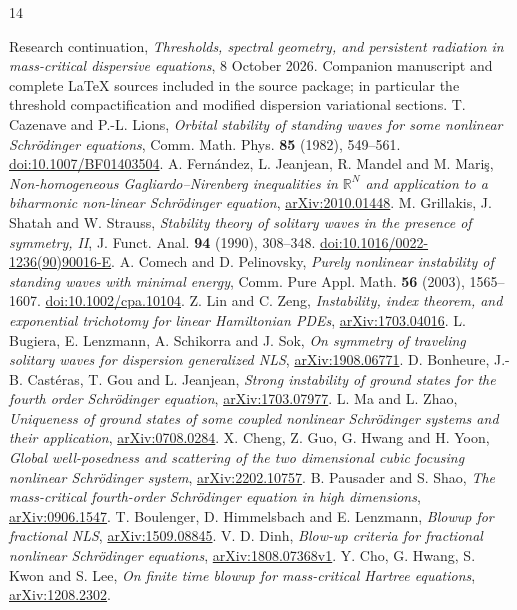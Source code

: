 \documentclass[11pt,a4paper]{article}
\theoremstyle{remark}\newtheorem{remark}[theorem]{Remark}
\begin{document}
\clearpage
\begin{thebibliography}{14}
\raggedright
{} Research continuation,
\emph{Thresholds, spectral geometry, and persistent radiation in
mass-critical dispersive equations}, 8 October 2026.
Companion manuscript and complete LaTeX sources included in the source
package; in particular the threshold compactification and modified
dispersion variational sections.
 T. Cazenave and P.-L. Lions,
\emph{Orbital stability of standing waves for some nonlinear Schr\"odinger equations},
Comm. Math. Phys. \textbf{85} (1982), 549--561.
\href{https://doi.org/10.1007/BF01403504}{doi:10.1007/BF01403504}.
 A. Fern\'andez, L. Jeanjean, R. Mandel and M. Mari\c{s},
\emph{Non-homogeneous Gagliardo--Nirenberg inequalities in
$\mathbb R^N$ and application to a biharmonic non-linear Schr\"odinger equation},
\href{https://arxiv.org/abs/2010.01448}{arXiv:2010.01448}.
 M. Grillakis, J. Shatah and W. Strauss,
\emph{Stability theory of solitary waves in the presence of symmetry, II},
J. Funct. Anal. \textbf{94} (1990), 308--348.
\href{https://doi.org/10.1016/0022-1236(90)90016-E}{doi:10.1016/0022-1236(90)90016-E}.
 A. Comech and D. Pelinovsky,
\emph{Purely nonlinear instability of standing waves with minimal energy},
Comm. Pure Appl. Math. \textbf{56} (2003), 1565--1607.
\href{https://doi.org/10.1002/cpa.10104}{doi:10.1002/cpa.10104}.
 Z. Lin and C. Zeng,
\emph{Instability, index theorem, and exponential trichotomy for linear
Hamiltonian PDEs},
\href{https://arxiv.org/abs/1703.04016}{arXiv:1703.04016}.
 L. Bugiera, E. Lenzmann, A. Schikorra and J. Sok,
\emph{On symmetry of traveling solitary waves for dispersion generalized NLS},
\href{https://arxiv.org/abs/1908.06771}{arXiv:1908.06771}.
 D. Bonheure, J.-B. Cast\'eras, T. Gou and L. Jeanjean,
\emph{Strong instability of ground states for the fourth order
Schr\"odinger equation},
\href{https://arxiv.org/abs/1703.07977}{arXiv:1703.07977}.
 L. Ma and L. Zhao,
\emph{Uniqueness of ground states of some coupled nonlinear Schr\"odinger
systems and their application},
\href{https://arxiv.org/abs/0708.0284}{arXiv:0708.0284}.
 X. Cheng, Z. Guo, G. Hwang and H. Yoon,
\emph{Global well-posedness and scattering of the two dimensional cubic
focusing nonlinear Schr\"odinger system},
\href{https://arxiv.org/abs/2202.10757}{arXiv:2202.10757}.
 B. Pausader and S. Shao,
\emph{The mass-critical fourth-order Schr\"odinger equation in high dimensions},
\href{https://arxiv.org/abs/0906.1547}{arXiv:0906.1547}.
 T. Boulenger, D. Himmelsbach and E. Lenzmann,
\emph{Blowup for fractional NLS},
\href{https://arxiv.org/abs/1509.08845}{arXiv:1509.08845}.
 V. D. Dinh,
\emph{Blow-up criteria for fractional nonlinear Schr\"odinger equations},
\href{https://arxiv.org/abs/1808.07368}{arXiv:1808.07368v1}.
 Y. Cho, G. Hwang, S. Kwon and S. Lee,
\emph{On finite time blowup for mass-critical Hartree equations},
\href{https://arxiv.org/abs/1208.2302}{arXiv:1208.2302}.
\end{thebibliography}
\end{document}
